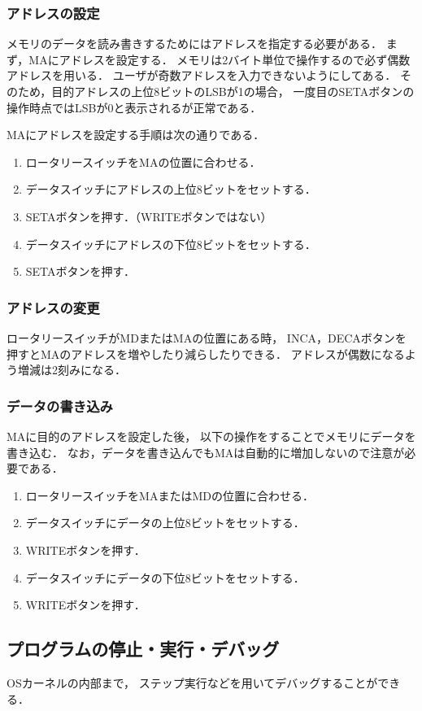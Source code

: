 \subsubsection{アドレスの設定}
メモリのデータを読み書きするためにはアドレスを指定する必要がある．
まず，MAにアドレスを設定する．
メモリは2バイト単位で操作するので必ず偶数アドレスを用いる．
ユーザが奇数アドレスを入力できないようにしてある．
そのため，目的アドレスの上位8ビットのLSBが1の場合，
一度目のSETAボタンの操作時点ではLSBが0と表示されるが正常である．

MAにアドレスを設定する手順は次の通りである．

\begin{enumerate}
\item ロータリースイッチをMAの位置に合わせる．
\item データスイッチにアドレスの上位8ビットをセットする．
\item SETAボタンを押す．（WRITEボタンではない）
\item データスイッチにアドレスの下位8ビットをセットする．
\item SETAボタンを押す．
\end{enumerate}

\subsubsection{アドレスの変更}
ロータリースイッチがMDまたはMAの位置にある時，
INCA，DECAボタンを押すとMAのアドレスを増やしたり減らしたりできる．
アドレスが偶数になるよう増減は2刻みになる．

\subsubsection{データの書き込み}
MAに目的のアドレスを設定した後，
以下の操作をすることでメモリにデータを書き込む．
なお，データを書き込んでもMAは自動的に増加しないので注意が必要である．

\begin{enumerate}
\item ロータリースイッチをMAまたはMDの位置に合わせる．
\item データスイッチにデータの上位8ビットをセットする．
\item WRITEボタンを押す．
\item データスイッチにデータの下位8ビットをセットする．
\item WRITEボタンを押す．
\end{enumerate}

\subsection{プログラムの停止・実行・デバッグ}
OSカーネルの内部まで，
ステップ実行などを用いてデバッグすることができる．

